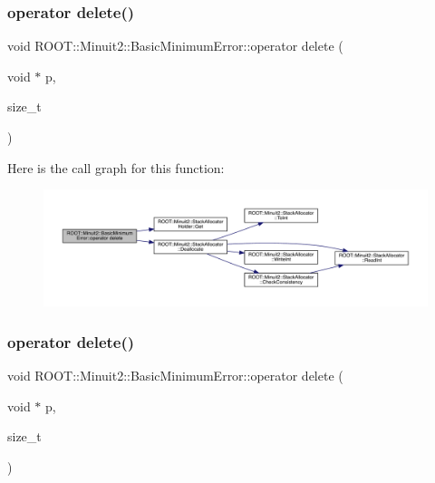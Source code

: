 \mbox{\label{classROOT_1_1Minuit2_1_1BasicMinimumError_ae64544fb94b090a6a9117243c5fa9f93}} 
\subsubsection{\texorpdfstring{operator delete()}{operator delete()}\hspace{0.1cm}{\footnotesize\ttfamily [1/3]}}
{\footnotesize\ttfamily void R\+O\+O\+T\+::\+Minuit2\+::\+Basic\+Minimum\+Error\+::operator delete (\begin{DoxyParamCaption}\item[{void $\ast$}]{p,  }\item[{size\+\_\+t}]{ }\end{DoxyParamCaption})\hspace{0.3cm}{\ttfamily [inline]}}

Here is the call graph for this function\+:
\nopagebreak
\begin{figure}[H]
\begin{center}
\leavevmode
\includegraphics[width=350pt]{d9/ddd/classROOT_1_1Minuit2_1_1BasicMinimumError_ae64544fb94b090a6a9117243c5fa9f93_cgraph}
\end{center}
\end{figure}
\mbox{\label{classROOT_1_1Minuit2_1_1BasicMinimumError_ae64544fb94b090a6a9117243c5fa9f93}} 
\subsubsection{\texorpdfstring{operator delete()}{operator delete()}\hspace{0.1cm}{\footnotesize\ttfamily [2/3]}}
{\footnotesize\ttfamily void R\+O\+O\+T\+::\+Minuit2\+::\+Basic\+Minimum\+Error\+::operator delete (\begin{DoxyParamCaption}\item[{void $\ast$}]{p,  }\item[{size\+\_\+t}]{ }\end{DoxyParamCaption})\hspace{0.3cm}{\ttfamily [inline]}}

